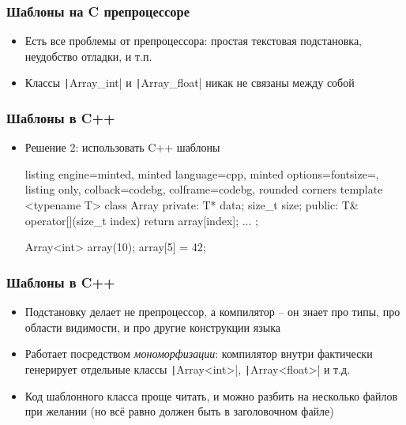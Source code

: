 \documentclass[10pt]{beamer}
\begin{document}
\begin{frame}[fragile]
\frametitle{Шаблоны на C препроцессоре}
\begin{itemize}
\item Есть все проблемы от препроцессора: простая текстовая подстановка, неудобство отладки, и т.п.
\pause
\item Классы \texttt|Array_int| и \texttt|Array_float| никак не связаны между собой
\end{itemize}
\end{frame}

\begin{frame}[fragile]
\frametitle{Шаблоны в C++}
\begin{itemize}
\item Решение 2: использовать C++ шаблоны
\pause
{}
\begin{tcblisting}{listing engine=minted, minted language=cpp, minted options={fontsize=\scriptsize}, listing only, colback=codebg, colframe=codebg, rounded corners}
template <typename T>
class Array {
private:
  T* data;
  size_t size;
public:
  T& operator[](size_t index) {
    return array[index];
  }
  ...
};

Array<int> array(10);
array[5] = 42;
\end{tcblisting}
\end{itemize}
\end{frame}

\begin{frame}[fragile]
\frametitle{Шаблоны в C++}
\begin{itemize}
\item Подстановку делает не препроцессор, а компилятор -- он знает про типы, про области видимости, и про другие конструкции языка
\pause
\item Работает посредством \textit{мономорфизации}: компилятор внутри фактически генерирует отдельные классы \texttt|Array<int>|, \texttt|Array<float>| и т.д.
\pause
\item Код шаблонного класса проще читать, и можно разбить на несколько файлов при желании (но всё равно должен быть в заголовочном файле)
\end{itemize}
\end{frame}
\end{document}
